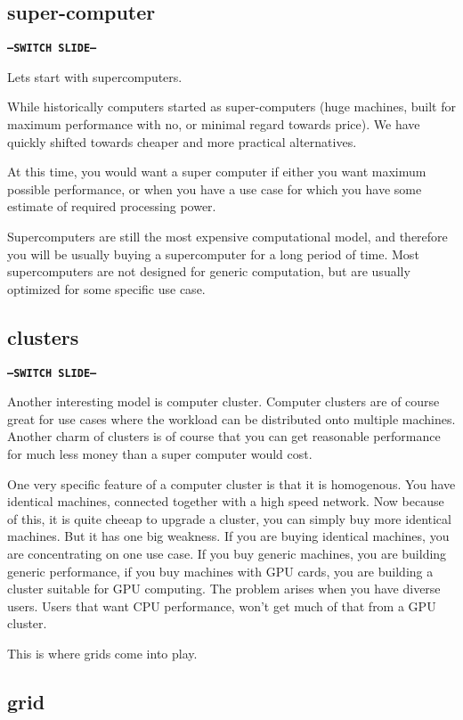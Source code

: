 \documentclass[12pt,a4paper]{article}
\begin{document}
\subsection{super-computer}

\texttt{\textbf{---SWITCH SLIDE---}}

Lets start with supercomputers.

While historically computers started as super-computers (huge machines, built
for maximum performance with no, or minimal regard towards price).  We have
quickly shifted towards cheaper and more practical alternatives.

At this time, you would want a super computer if either you want maximum
possible performance, or when you have a use case for which you have some
estimate of required processing power.

Supercomputers are still the most expensive computational model, and therefore
you will be usually buying a supercomputer for a long period of time. Most
supercomputers are not designed for generic computation, but are usually optimized for some specific use case.

\subsection{clusters}

\texttt{\textbf{---SWITCH SLIDE---}}

Another interesting model is computer cluster.
Computer clusters are of course great for use cases where the workload can be distributed onto multiple machines.
Another charm of clusters is of course that you can get reasonable performance for much less money than a super computer would cost.

One very specific feature of a computer cluster is that it is homogenous.
You have identical machines, connected together with a high speed network.
Now because of this, it is quite cheeap to upgrade a cluster, you can simply buy more identical machines.
But it has one big weakness. If you are buying identical machines, you are concentrating on one use case.
If you buy generic machines, you are building generic performance, if you buy machines with GPU cards, you are building a cluster suitable for GPU computing.
The problem arises when you have diverse users. Users that want CPU performance, won't get much of that from a GPU cluster.

This is where grids come into play.

\subsection{grid}
\end{document}
